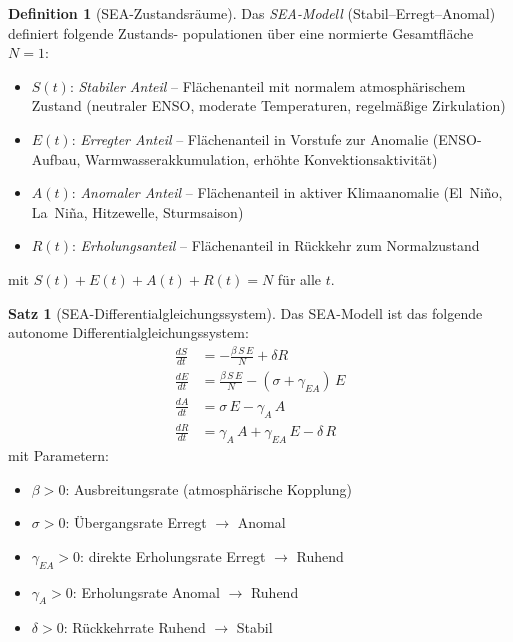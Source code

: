 ﻿\documentclass[a4paper,12pt]{article}
\theoremstyle{definition}
\newtheorem{definition}{Definition}
\newtheorem{satz}{Satz}
\begin{document}
\begin{definition}[SEA-Zustandsr\"aume]
Das \emph{SEA-Modell} (Stabil--Erregt--Anomal) definiert folgende Zustands-
populationen \"uber eine normierte Gesamtfl\"ache $N = 1$:
\begin{itemize}
    \item $S(t)$: \emph{Stabiler Anteil} -- Fl\"achenanteil mit normalem atmosph\"arischem
          Zustand (neutraler ENSO, moderate Temperaturen, regelm\"aßige Zirkulation)
    \item $E(t)$: \emph{Erregter Anteil} -- Fl\"achenanteil in Vorstufe zur Anomalie
          (ENSO-Aufbau, Warmwasserakkumulation, erh\"ohte Konvektionsaktivit\"at)
    \item $A(t)$: \emph{Anomaler Anteil} -- Fl\"achenanteil in aktiver Klimaanomalie
          (El~Ni\~no, La~Ni\~na, Hitzewelle, Sturmsaison)
    \item $R(t)$: \emph{Erholungsanteil} -- Fl\"achenanteil in R\"uckkehr zum Normalzustand
\end{itemize}
mit $S(t) + E(t) + A(t) + R(t) = N$ f\"ur alle $t$.
\end{definition}

\begin{satz}[SEA-Differentialgleichungssystem]
\label{satz:sea}
Das SEA-Modell ist das folgende autonome Differentialgleichungssystem:
\begin{align}
\frac{dS}{dt} &= -\frac{\beta\, S\, E}{N} + \delta R \label{eq:dS}\\
\frac{dE}{dt} &= \frac{\beta\, S\, E}{N} - (\sigma + \gamma_{EA})\, E \label{eq:dE}\\
\frac{dA}{dt} &= \sigma\, E - \gamma_A\, A \label{eq:dA}\\
\frac{dR}{dt} &= \gamma_A\, A + \gamma_{EA}\, E - \delta\, R \label{eq:dR}
\end{align}
mit Parametern:
\begin{itemize}
    \item $\beta > 0$: Ausbreitungsrate (atmosph\"arische Kopplung)
    \item $\sigma > 0$: \"Ubergangsrate Erregt $\to$ Anomal
    \item $\gamma_{EA} > 0$: direkte Erholungsrate Erregt $\to$ Ruhend
    \item $\gamma_A > 0$: Erholungsrate Anomal $\to$ Ruhend
    \item $\delta > 0$: R\"uckkehrrate Ruhend $\to$ Stabil
\end{itemize}
\end{satz}
\end{document}
